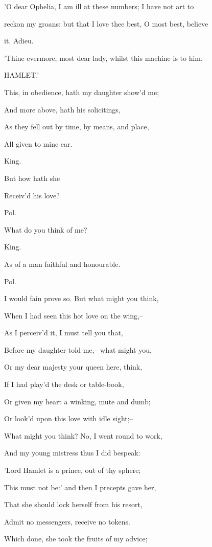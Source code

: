 \documentclass[12pt]{book}
\begin{document}
'O dear Ophelia, I am ill at these numbers; I have not art to

reckon my groans: but that I love thee best, O most best, believe

it. Adieu.

  'Thine evermore, most dear lady, whilst this machine is to him,

     HAMLET.'

This, in obedience, hath my daughter show'd me;

And more above, hath his solicitings,

As they fell out by time, by means, and place,

All given to mine ear.



King.

But how hath she

Receiv'd his love?



Pol.

What do you think of me?



King.

As of a man faithful and honourable.



Pol.

I would fain prove so. But what might you think,

When I had seen this hot love on the wing,--

As I perceiv'd it, I must tell you that,

Before my daughter told me,-- what might you,

Or my dear majesty your queen here, think,

If I had play'd the desk or table-book,

Or given my heart a winking, mute and dumb;

Or look'd upon this love with idle sight;--

What might you think? No, I went round to work,

And my young mistress thus I did bespeak:

'Lord Hamlet is a prince, out of thy sphere;

This must not be:' and then I precepts gave her,

That she should lock herself from his resort,

Admit no messengers, receive no tokens.

Which done, she took the fruits of my advice;
\end{document}
